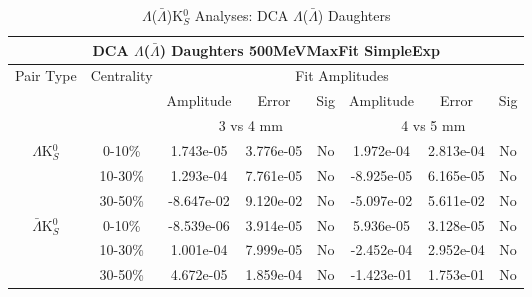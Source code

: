 \documentclass[../AnalysisNoteJBuxton.tex]{subfiles}
\begin{document}
\begin{table}
 \centering
 \begin{tabular}{|c|c|c|c|c||c|c|c|}
  \multicolumn{8}{c}{DCA $\Lambda$($\bar{\Lambda}$) Daughters 500MeVMaxFit SimpleExp} \\
  \hline
  \multirow{3}{*}{Pair Type} & \multirow{3}{*}{Centrality} & \multicolumn{6}{c|}{Fit Amplitudes} \\
  \cline{3-8}
   & & Amplitude & Error & Sig & Amplitude & Error & Sig \\  
  \cline{3-8}
   & & \multicolumn{3}{c||}{3 vs 4 mm} & \multicolumn{3}{c|}{4 vs 5 mm} \\  
  \hline  
  \multirow{3}{*}{$\Lambda$K$^{0}_{S}$}  
   &  0-10\% & 1.743e-05 & 3.776e-05 & No & 1.972e-04 & 2.813e-04 & No \\
   & 10-30\% & 1.293e-04 & 7.761e-05 & No & -8.925e-05 & 6.165e-05 & No \\
   & 30-50\% & -8.647e-02 & 9.120e-02 & No & -5.097e-02 & 5.611e-02 & No \\
  \hline  
  \multirow{3}{*}{$\bar{\Lambda}$K$^{0}_{S}$}  
   &  0-10\% & -8.539e-06 & 3.914e-05 & No & 5.936e-05 & 3.128e-05 & No \\
   & 10-30\% & 1.001e-04 & 7.999e-05 & No & -2.452e-04 & 2.952e-04 & No \\
   & 30-50\% & 4.672e-05 & 1.859e-04 & No & -1.423e-01 & 1.753e-01 & No \\
  \hline
 \end{tabular}
 \caption{$\Lambda$($\bar{\Lambda}$)K$^{0}_{S}$ Analyses: DCA $\Lambda$($\bar{\Lambda}$) Daughters}
 \label{tab:LamDaughtersDcaLamK0_500MeVMaxFit_SimpleExp}
\end{table}





\clearpage
\end{document}
